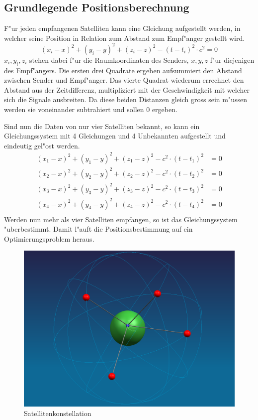 \begin{refsection}
\section{Grundlegende Positionsberechnung}
F"ur jeden empfangenen Satelliten kann eine Gleichung aufgestellt
werden, in welcher seine Position in Relation zum Abstand zum Empf"anger
gestellt wird.
\[
(x_i - x)^2 + (y_i - y)^2 + (z_i - z)^2 - (t - t_i)^2\cdot c^2 = 0
\]
$x_i, y_i, z_i$ stehen dabei f"ur die Raumkoordinaten des Senders,
$x, y, z$ f"ur diejenigen des Empf"angers. Die ersten drei Quadrate
ergeben aufsummiert den Abstand zwischen Sender und Empf"anger. Das
vierte Quadrat wiederum errechnet den Abstand aus der Zeitdifferenz,
multipliziert mit der Geschwindigkeit mit welcher sich die Signale
ausbreiten. Da diese beiden Distanzen gleich gross sein m"ussen werden
sie voneinander subtrahiert und sollen 0 ergeben.

Sind nun die Daten von nur vier Satelliten bekannt, so kann ein
Gleichungssystem mit 4 Gleichungen und 4 Unbekannten aufgestellt und
eindeutig gel"ost werden.
\begin{align*}
	(x_1 - x)^2 + (y_1 - y)^2 + (z_1 - z)^2 - c^2\cdot(t - t_1)^2 &= 0\\
	(x_2 - x)^2 + (y_2 - y)^2 + (z_2 - z)^2 - c^2\cdot(t - t_2)^2 &= 0\\
	(x_3 - x)^2 + (y_3 - y)^2 + (z_3 - z)^2 - c^2\cdot(t - t_3)^2 &= 0\\
	(x_4 - x)^2 + (y_4 - y)^2 + (z_4 - z)^2 - c^2\cdot(t - t_4)^2 &= 0\\
\end{align*}
Werden nun mehr als vier Satelliten empfangen, so ist das
Gleichungssystem "uberbestimmt. Damit l"auft die Positionsbestimmung
auf ein Optimierungsproblem heraus.

\begin{figure}[ht!]\centering
	\includegraphics[scale = 0.3]{gps/gps.png}
	\caption{Satellitenkonstellation}
	\label{fig. satellitenkonstellation}
\end{figure}


\end{refsection}

